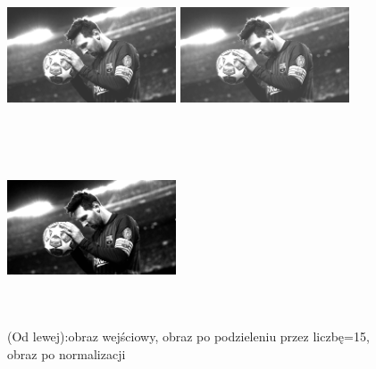 \documentclass[magisterska,openany]{pracadypl}
\begin{document}
\begin{figure}[h]
\centering
\includegraphics[width=5cm, height=5cm]{orgi/gMessi.jpg}
\includegraphics[width=5cm, height=5cm]{3_7/div_constG1.jpg}
\includegraphics[width=5cm, height=5cm]{3_7/ndiv_constG1.jpg}
\caption{(Od lewej):obraz wejściowy,  obraz po podzieleniu przez liczbę=15,
obraz po normalizacji}
\end{figure}
\end{document}
